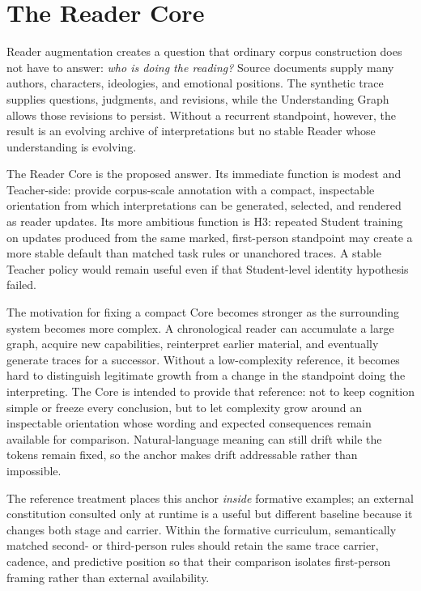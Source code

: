 \section{The Reader Core}\label{sec:reader-core}

Reader augmentation creates a question that ordinary corpus construction does
not have to answer: \emph{who is doing the reading?} Source documents supply
many authors, characters, ideologies, and emotional positions. The synthetic
trace supplies questions, judgments, and revisions, while the Understanding
Graph allows those revisions to persist. Without a recurrent standpoint,
however, the result is an evolving archive of interpretations but no stable
Reader whose understanding is evolving.

The Reader Core is the proposed answer. Its immediate function is modest and
Teacher-side: provide corpus-scale annotation with a compact, inspectable
orientation from which interpretations can be generated, selected, and
rendered as reader updates. Its more ambitious function is H3: repeated Student
training on updates produced from the same marked, first-person standpoint may
create a more stable default than matched task rules or unanchored traces. A
stable Teacher policy would remain useful even if that Student-level identity
hypothesis failed.

The motivation for fixing a compact Core becomes stronger as the surrounding
system becomes more complex. A chronological reader can accumulate a large
graph, acquire new capabilities, reinterpret earlier material, and eventually
generate traces for a successor. Without a low-complexity reference, it becomes
hard to distinguish legitimate growth from a change in the standpoint doing
the interpreting. The Core is intended to provide that reference: not to keep
cognition simple or freeze every conclusion, but to let complexity grow around
an inspectable orientation whose wording and expected consequences remain
available for comparison. Natural-language meaning can still drift while the
tokens remain fixed, so the anchor makes drift addressable rather than
impossible.

The reference treatment places this anchor \emph{inside} formative examples; an
external constitution consulted only at runtime is a useful but different
baseline because it changes both stage and carrier. Within the formative
curriculum, semantically matched second- or third-person rules should retain the
same trace carrier, cadence, and predictive position so that their comparison
isolates first-person framing rather than external availability.

